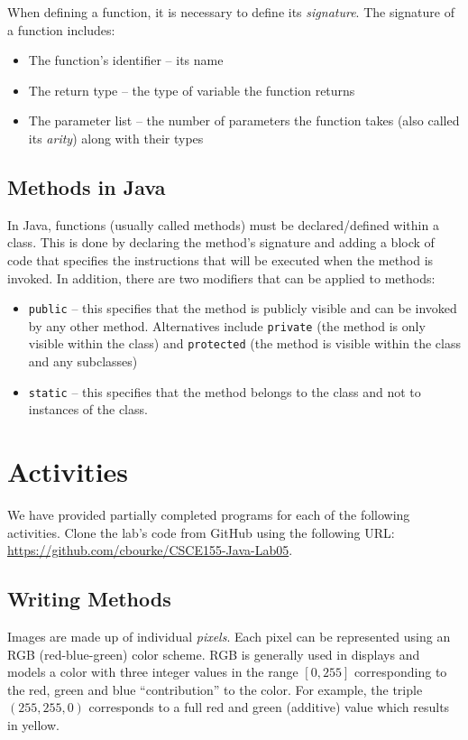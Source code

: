 \documentclass[12pt]{scrartcl}
\begin{document}
When defining a function, it is necessary to define its \emph{signature}.  
The signature of a function includes:
\begin{itemize}
  \item The function's identifier -- its name 
  \item The return type -- the type of variable the function returns
  \item The parameter list -- the number of parameters the function takes 
	(also called its \emph{arity}) along with their types 
\end{itemize}

\subsection{Methods in Java}

In Java, functions (usually called methods) must be declared/defined 
within a class.  This is done by declaring the method's signature and 
adding a block of code that specifies the instructions that will be executed 
when the method is invoked.  In addition, there are two modifiers that 
can be applied to methods:
\begin{itemize}
  \item \texttt{public} -- this specifies that the method is publicly 
  	visible and can be invoked by any other method.  Alternatives include 
	\texttt{private} (the method is only visible within the class) 
	and \texttt{protected} (the method is visible within the class 
	and any subclasses)
  \item \texttt{static} -- this specifies that the method belongs to the 
	class and not to instances of the class.
\end{itemize}

\section{Activities}

We have provided partially completed programs for each of the 
following activities.  Clone the lab's code from GitHub using the 
following URL: \url{https://github.com/cbourke/CSCE155-Java-Lab05}.

\subsection{Writing Methods}

Images are made up of individual \emph{pixels}.  Each pixel can be 
represented using an RGB (red-blue-green) color scheme.  RGB is 
generally used in displays and models a color with three integer 
values in the range $[0, 255]$ corresponding to the red, green and 
blue ``contribution'' to the color.  For example, the triple 
$(255, 255, 0)$ corresponds to a full red and green (additive) value
which results in yellow.  
\end{document}
